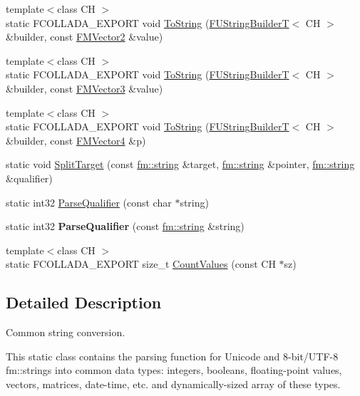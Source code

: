 \begin{DoxyCompactItemize}
\item 
{\footnotesize template$<$class CH $>$ }\\static FCOLLADA\_\-EXPORT void \hyperlink{classFUStringConversion_a90e73cb77a987ef8f5d1801c172dd2f1}{ToString} (\hyperlink{classFUStringBuilderT}{FUStringBuilderT}$<$ CH $>$ \&builder, const \hyperlink{classFMVector2}{FMVector2} \&value)
\item 
{\footnotesize template$<$class CH $>$ }\\static FCOLLADA\_\-EXPORT void \hyperlink{classFUStringConversion_ad3ff2dd7156706f2ea5234e8cb39159f}{ToString} (\hyperlink{classFUStringBuilderT}{FUStringBuilderT}$<$ CH $>$ \&builder, const \hyperlink{classFMVector3}{FMVector3} \&value)
\item 
{\footnotesize template$<$class CH $>$ }\\static FCOLLADA\_\-EXPORT void \hyperlink{classFUStringConversion_a1d515b61aaba6faca60a0fedba79577f}{ToString} (\hyperlink{classFUStringBuilderT}{FUStringBuilderT}$<$ CH $>$ \&builder, const \hyperlink{classFMVector4}{FMVector4} \&p)
\item 
static void \hyperlink{classFUStringConversion_a195e93613a60b418fa171974ea9c0fc4}{SplitTarget} (const \hyperlink{classfm_1_1stringT}{fm::string} \&target, \hyperlink{classfm_1_1stringT}{fm::string} \&pointer, \hyperlink{classfm_1_1stringT}{fm::string} \&qualifier)
\item 
static int32 \hyperlink{classFUStringConversion_ab230670eecc946527cc91dd5fc13c5d5}{ParseQualifier} (const char $\ast$string)
\item 
\hypertarget{classFUStringConversion_ac6c8bf603387a4ac84c3efdb2c14823b}{
static int32 {\bfseries ParseQualifier} (const \hyperlink{classfm_1_1stringT}{fm::string} \&string)}
\label{classFUStringConversion_ac6c8bf603387a4ac84c3efdb2c14823b}

\item 
{\footnotesize template$<$class CH $>$ }\\static FCOLLADA\_\-EXPORT size\_\-t \hyperlink{classFUStringConversion_ae295e9b2b98a9980aca89e8f0b7d922c}{CountValues} (const CH $\ast$sz)
\end{DoxyCompactItemize}


\subsection{Detailed Description}
Common string conversion.

This static class contains the parsing function for Unicode and 8-\/bit/UTF-\/8 fm::strings into common data types: integers, booleans, floating-\/point values, vectors, matrices, date-\/time, etc. and dynamically-\/sized array of these types.

